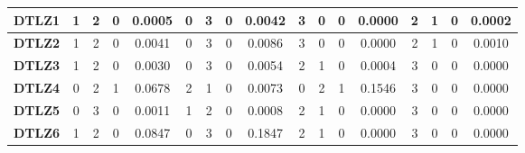 \begin{table*}[t]
{\begin{tabular}{c|c|c|c|c|c|c|c|c|c|c|c|c|c|c|c|c|}
\multicolumn{1}{|c|}{\textbf{DTLZ1}} & 1                   & 2                     & 0                          & 0.0005          & 0                   & 3                     & 0                          & 0.0042          & 3                   & 0                     & 0                          & 0.0000          & 2                   & 1                     & 0                          & 0.0002          \\ \hline
\multicolumn{1}{|c|}{\textbf{DTLZ2}} & 1                   & 2                     & 0                          & 0.0041          & 0                   & 3                     & 0                          & 0.0086          & 3                   & 0                     & 0                          & 0.0000          & 2                   & 1                     & 0                          & 0.0010          \\ \hline
\multicolumn{1}{|c|}{\textbf{DTLZ3}} & 1                   & 2                     & 0                          & 0.0030          & 0                   & 3                     & 0                          & 0.0054          & 2                   & 1                     & 0                          & 0.0004          & 3                   & 0                     & 0                          & 0.0000          \\ \hline
\multicolumn{1}{|c|}{\textbf{DTLZ4}} & 0                   & 2                     & 1                          & 0.0678          & 2                   & 1                     & 0                          & 0.0073          & 0                   & 2                     & 1                          & 0.1546          & 3                   & 0                     & 0                          & 0.0000          \\ \hline
\multicolumn{1}{|c|}{\textbf{DTLZ5}} & 0                   & 3                     & 0                          & 0.0011          & 1                   & 2                     & 0                          & 0.0008          & 2                   & 1                     & 0                          & 0.0000          & 3                   & 0                     & 0                          & 0.0000          \\ \hline
\multicolumn{1}{|c|}{\textbf{DTLZ6}} & 1                   & 2                     & 0                          & 0.0847          & 0                   & 3                     & 0                          & 0.1847          & 2                   & 1                     & 0                          & 0.0000          & 3                   & 0                     & 0                          & 0.0000          \\ \hline

\end{tabular}}
\end{table*}
